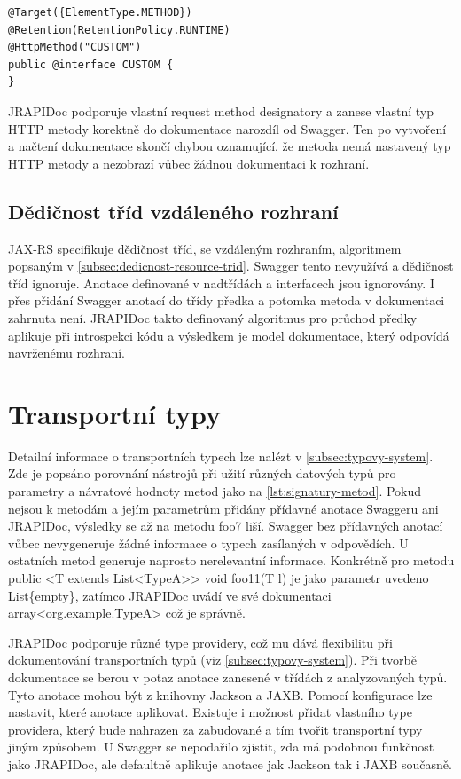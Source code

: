 \documentclass[11pt,twoside,a4paper]{book}
\begin{document}
\begin{lstlisting}[frame=single, caption={Vlastní request method
designator},label={lst:vlastni-designator}] 
@Target({ElementType.METHOD})
@Retention(RetentionPolicy.RUNTIME)
@HttpMethod("CUSTOM")
public @interface CUSTOM {
}
\end{lstlisting}

JRAPIDoc podporuje vlastní request method designatory a zanese vlastní typ HTTP
metody korektně do dokumentace narozdíl od Swagger. Ten po vytvoření a načtení
dokumentace skončí chybou oznamující, že metoda nemá nastavený typ HTTP metody a
nezobrazí vůbec žádnou dokumentaci k rozhraní.

\subsection{Dědičnost tříd vzdáleného rozhraní}

JAX-RS specifikuje dědičnost tříd, se vzdáleným rozhraním, algoritmem popsaným v
\ref{subsec:dedicnost-resource-trid}. Swagger tento nevyužívá a dědičnost tříd
ignoruje. Anotace definované v nadtřídách a interfacech jsou ignorovány. I přes
přidání Swagger anotací do třídy předka a potomka metoda v dokumentaci zahrnuta
není. JRAPIDoc takto definovaný algoritmus pro průchod předky aplikuje při
introspekci kódu a výsledkem je model dokumentace, který odpovídá navrženému rozhraní.

\section{Transportní typy}

Detailní informace o transportních typech lze nalézt v
\ref{subsec:typovy-system}.
Zde je popsáno porovnání nástrojů při užití různých datových typů pro
parametry a návratové hodnoty metod jako na \ref{lst:signatury-metod}. Pokud nejsou k
metodám a jejím parametrům přidány přídavné anotace Swaggeru ani JRAPIDoc,
výsledky se až na metodu foo7 liší. Swagger bez přídavných anotací vůbec
nevygeneruje žádné informace o typech zasílaných v odpovědích. U ostatních metod generuje
naprosto nerelevantní informace. Konkrétně pro metodu 
public <T extends List<TypeA>> void foo11(T l) je jako parametr uvedeno
List\{empty\}, zatímco JRAPIDoc uvádí ve své dokumentaci
array<org.example.TypeA> což je správně.

JRAPIDoc podporuje různé type providery, což mu dává flexibilitu při
dokumentování transportních typů (viz \ref{subsec:typovy-system}). Při tvorbě
dokumentace se berou v potaz anotace zanesené v třídách z analyzovaných typů. Tyto anotace mohou být z
knihovny Jackson a JAXB. Pomocí konfigurace lze nastavit, které anotace
aplikovat. Existuje i možnost přidat vlastního type providera, který bude
nahrazen za zabudované a tím tvořit transportní typy jiným způsobem. 
U Swagger se nepodařilo zjistit, zda má podobnou funkčnost jako JRAPIDoc, ale
defaultně aplikuje anotace jak Jackson tak i JAXB současně.
\end{document}
